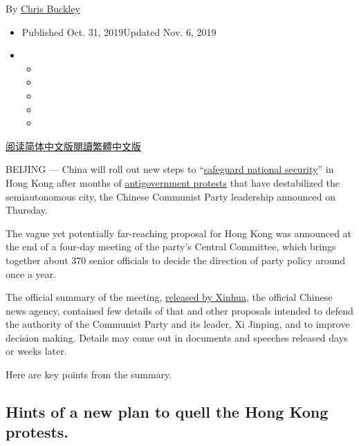 By \href{https://www.nytimes.com/by/chris-buckley}{Chris Buckley}

\begin{itemize}
\item
  Published Oct. 31, 2019Updated Nov. 6, 2019
\item
  \begin{itemize}
  \item
  \item
  \item
  \item
  \item
  \end{itemize}
\end{itemize}

\href{https://cn.nytimes.com/china/20191101/hong-kong-protests-china/}{阅读简体中文版}\href{https://cn.nytimes.com/china/20191101/hong-kong-protests-china/zh-hant/}{閱讀繁體中文版}

BEIJING --- China will roll out new steps to
``\href{https://www.nytimes.com/2019/11/06/world/asia/hong-kong-protests-china-national-security.html}{safeguard
national security}'' in Hong Kong after months of
\href{https://www.nytimes.com/2019/10/31/world/asia/hong-kong-halloween.html}{antigovernment
protests} that have destabilized the semiautonomous city, the Chinese
Communist Party leadership announced on Thursday.

The vague yet potentially far-reaching proposal for Hong Kong was
announced at the end of a four-day meeting of the party's Central
Committee, which brings together about 370 senior officials to decide
the direction of party policy around once a year.

The official summary of the meeting,
\href{http://www.chinanews.com/gn/2019/10-31/8994802.shtml}{released by
Xinhua}, the official Chinese news agency, contained few details of that
and other proposals intended to defend the authority of the Communist
Party and its leader, Xi Jinping, and to improve decision making.
Details may come out in documents and speeches released days or weeks
later.

Here are key points from the summary.

\hypertarget{hints-of-a-new-plan-to-quell-the-hong-kong-protests}{%
\subsection{Hints of a new plan to quell the Hong Kong
protests.}\label{hints-of-a-new-plan-to-quell-the-hong-kong-protests}}

